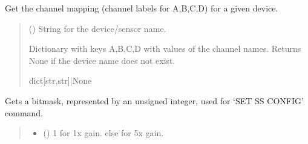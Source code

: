 \documentclass[letterpaper,10pt,english]{sphinxmanual}
\begin{document}
\begin{fulllineitems}

\begin{fulllineitems}
\label{\detokenize{PodApi.Devices:PodApi.Devices.PodDevice_8401HR.Pod8401HR.GetChannelMapForPreampDevice}}
\pysigstartsignatures
{}
\pysigstopsignatures
\sphinxAtStartPar
Get the channel mapping (channel labels for A,B,C,D) for a given device.
\begin{quote}\begin{description}
\sphinxAtStartPar
{} () \textendash{} String for the device/sensor name.

\sphinxAtStartPar
Dictionary with keys A,B,C,D with values of the channel names. Returns                 None if the device name does not exist.

\sphinxAtStartPar
dict{[}str,str{]}|None

\end{description}\end{quote}

\end{fulllineitems}


\begin{fulllineitems}
\label{\detokenize{PodApi.Devices:PodApi.Devices.PodDevice_8401HR.Pod8401HR.GetSSConfigBitmask}}
\pysigstartsignatures
{}
\pysigstopsignatures
\sphinxAtStartPar
Gets a bitmask, represented by an unsigned integer, used for ‘SET SS CONFIG’ command.
\begin{quote}\begin{description}
\begin{itemize}
\item {} 
\sphinxAtStartPar
{} () \textendash{} 1 for 1x gain. else for 5x gain.


\end{itemize}
\end{description}
\end{quote}
\end{fulllineitems}
\end{fulllineitems}
\end{document}
